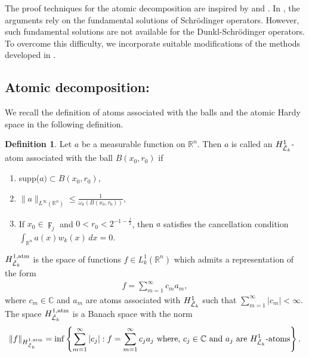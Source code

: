 \documentclass[11pt, reqno]{amsproc}
\theoremstyle{definition}
\newtheorem{definition}[theorem]{Definition}
\theoremstyle{remark}
\numberwithin{equation}{section}
\begin{document}
The proof techniques for the atomic decomposition are inspired by \cite{Dziubanski-1999} and \cite{Jacek-2004}. In \cite{Dziubanski-1999}, the arguments rely on the fundamental solutions of Schr\"odinger operators. However, such fundamental solutions are not available for the Dunkl-Schr\"odinger operators. To overcome this difficulty, we incorporate suitable modifications of the methods developed in \cite{Jacek-2004}. 

\subsection{Atomic decomposition:} We recall the definition of atoms associated with the balls and the atomic Hardy space in the following definition. 
\begin{definition} \label{atom-def}
     Let $a$ be a measurable function on $\mathbb{R}^n$. Then $a$ is called an $H_{\Tilde{\mathcal{L}}_k}^1$-atom associated with the ball $B(x_0,r_0)$ if
     \begin{enumerate}[$(i)$]
         \item supp($a) \subset B(x_0,r_0)$,\\
         \item $\|a\|_{L^\infty(\mathbb{R}^n)} \leq \frac{1}{\omega_k(B(x_0,r_0))},$\\
         \item If $x_0 \in \digamma_j$ and  
$0 < r_0 < 2^{-1-\frac{j}{2}}$, then $a$ satisfies the cancellation condition $\int_{\mathbb{R}^n} a(x) w_k(x)\, dx = 0$. 
     \end{enumerate}
      \end{definition}
$H_{\Tilde{\mathcal{L}}_k}^{1,\text{atm}}$ is the space of functions $f\in L_k^1(\mathbb{R}^n)$ which admits a representation of the form 
\begin{align*}
    f=\sum_{m=1}^\infty c_ma_m,
\end{align*} where $c_m \in \mathbb{C}$ and $a_m$ are atoms associated with $H^1_{\Tilde{\mathcal{L}}_k}$ such that $\sum_{m=1}^\infty|c_m|< \infty$. The space $H_{\Tilde{\mathcal{L}}_k}^{1,\text{atm}}$ is a Banach space with the norm 
\begin{align*}
    \|f\|_{H_{\Tilde{\mathcal{L}}_k}^{1,\text{atm}}} = \inf \left\{ \sum\limits_{m=1}^\infty |c_j| : f= \sum\limits_{m=1}^\infty c_ja_j \text{ where, }c_j\in \mathbb{C} \text{ and } 
    a_j \text{ are } H_{\Tilde{\mathcal{L}}_k}^{1} \text{-atoms} \right \}.
\end{align*}
      
\end{document}
